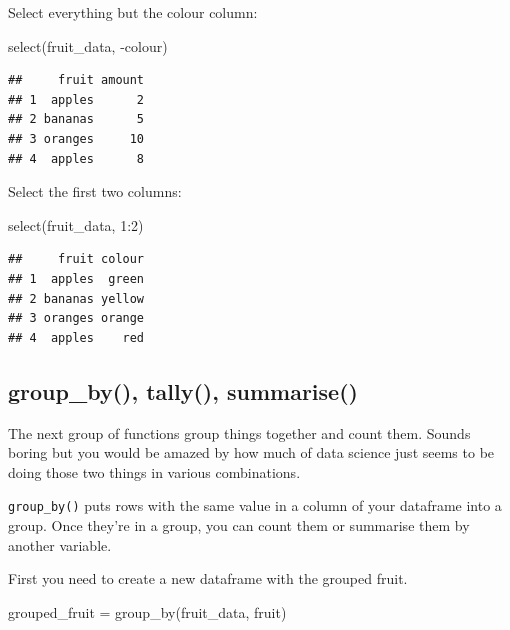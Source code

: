 \documentclass[
]{book}
\newenvironment{Shaded}{\begin{snugshade}}{\end{snugshade}}
\newcommand{\DecValTok}[1]{\textcolor[rgb]{0.00,0.00,0.81}{#1}}
\newcommand{\FunctionTok}[1]{\textcolor[rgb]{0.00,0.00,0.00}{#1}}
\newcommand{\NormalTok}[1]{#1}
\newcommand{\OtherTok}[1]{\textcolor[rgb]{0.56,0.35,0.01}{#1}}
\newcommand{\SpecialCharTok}[1]{\textcolor[rgb]{0.00,0.00,0.00}{#1}}
\begin{document}
Select everything but the colour column:

\begin{Shaded}
\begin{Highlighting}[]
\FunctionTok{select}\NormalTok{(fruit\_data, }\SpecialCharTok{{-}}\NormalTok{colour)}
\end{Highlighting}
\end{Shaded}

\begin{verbatim}
##     fruit amount
## 1  apples      2
## 2 bananas      5
## 3 oranges     10
## 4  apples      8
\end{verbatim}

Select the first two columns:

\begin{Shaded}
\begin{Highlighting}[]
\FunctionTok{select}\NormalTok{(fruit\_data, }\DecValTok{1}\SpecialCharTok{:}\DecValTok{2}\NormalTok{)}
\end{Highlighting}
\end{Shaded}

\begin{verbatim}
##     fruit colour
## 1  apples  green
## 2 bananas yellow
## 3 oranges orange
## 4  apples    red
\end{verbatim}

\hypertarget{group_by-tally-summarise}{%
\subsection{group\_by(), tally(), summarise()}\label{group_by-tally-summarise}}

The next group of functions group things together and count them. Sounds boring but you would be amazed by how much of data science just seems to be doing those two things in various combinations.

\texttt{group\_by()} puts rows with the same value in a column of your dataframe into a group. Once they're in a group, you can count them or summarise them by another variable.

First you need to create a new dataframe with the grouped fruit.

\begin{Shaded}
\begin{Highlighting}[]
\NormalTok{grouped\_fruit }\OtherTok{=} \FunctionTok{group\_by}\NormalTok{(fruit\_data, fruit)}
\end{Highlighting}
\end{Shaded}
\end{document}
